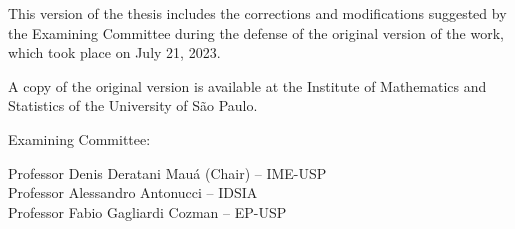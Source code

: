 \vspace{3cm}


\begin{flushright}
  \begin{minipage}{10cm}
    \begin{flushright}
      This version of the thesis includes the corrections and modifications suggested by the Examining Committee during the defense of the original version of the work, which took place on July 21, 2023.

      \vspace{1em}

      A copy of the original version is available at the Institute of Mathematics and Statistics of the University of São Paulo.
    \end{flushright}
  \end{minipage}
\end{flushright}

\vspace{8em}

\noindent Examining Committee:

\vspace{1em}

\noindent Professor Denis Deratani Mauá (Chair) -- IME-USP\\
Professor Alessandro Antonucci -- IDSIA\\
Professor Fabio Gagliardi Cozman -- EP-USP


\restoregeometry

\blankpage
